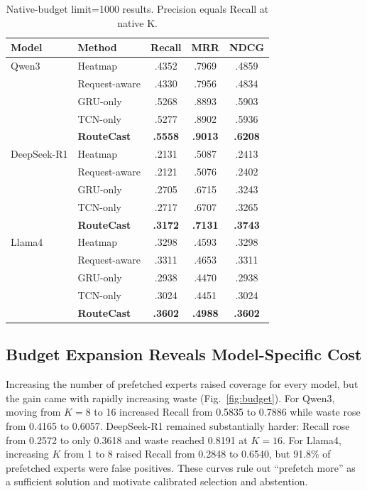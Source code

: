 \documentclass[conference]{IEEEtran}
\begin{document}
\begin{table}[!t]
\centering
\caption{Native-budget limit=1000 results. Precision equals Recall at native K.}
\label{tab:main}
\scriptsize
\setlength{\tabcolsep}{2.4pt}
\begin{tabular}{llccc}
\toprule
Model & Method & Recall & MRR & NDCG \\
\midrule
Qwen3 & Heatmap & .4352 & .7969 & .4859 \\
& Request-aware & .4330 & .7956 & .4834 \\
& GRU-only & .5268 & .8893 & .5903 \\
& TCN-only & .5277 & .8902 & .5936 \\
& \textbf{RouteCast} & \textbf{.5558} & \textbf{.9013} & \textbf{.6208} \\
\midrule
DeepSeek-R1 & Heatmap & .2131 & .5087 & .2413 \\
& Request-aware & .2121 & .5076 & .2402 \\
& GRU-only & .2705 & .6715 & .3243 \\
& TCN-only & .2717 & .6707 & .3265 \\
& \textbf{RouteCast} & \textbf{.3172} & \textbf{.7131} & \textbf{.3743} \\
\midrule
Llama4 & Heatmap & .3298 & .4593 & .3298 \\
& Request-aware & .3311 & .4653 & .3311 \\
& GRU-only & .2938 & .4470 & .2938 \\
& TCN-only & .3024 & .4451 & .3024 \\
& \textbf{RouteCast} & \textbf{.3602} & \textbf{.4988} & \textbf{.3602} \\
\bottomrule
\end{tabular}
\end{table}

\subsection{Budget Expansion Reveals Model-Specific Cost}
Increasing the number of prefetched experts raised coverage for every model, but the gain came with rapidly increasing waste (Fig.~\ref{fig:budget}). For Qwen3, moving from $K=8$ to 16 increased Recall from 0.5835 to 0.7886 while waste rose from 0.4165 to 0.6057. DeepSeek-R1 remained substantially harder: Recall rose from 0.2572 to only 0.3618 and waste reached 0.8191 at $K=16$. For Llama4, increasing $K$ from 1 to 8 raised Recall from 0.2848 to 0.6540, but 91.8\% of prefetched experts were false positives. These curves rule out ``prefetch more'' as a sufficient solution and motivate calibrated selection and abstention.
\end{document}
